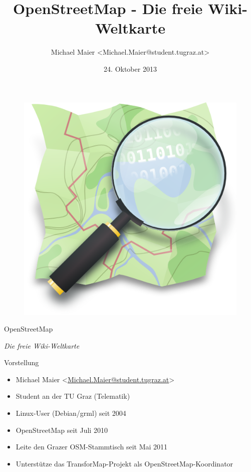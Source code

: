 \documentclass{beamer}
\title{OpenStreetMap - Die freie Wiki-Weltkarte}
\author{Michael Maier \textless Michael.Maier@student.tugraz.at\textgreater}
\date{24. Oktober 2013}
\begin{document}

\begin{frame} 


\begin{figure}
  \centering
  \includegraphics[width=.5\textwidth]{mag_map.png}
\end{figure}

\begin{center}
\Huge{OpenStreetMap\\}
\end{center}

\begin{center}
\Large{\emph{Die freie Wiki-Weltkarte}}
\end{center}

\end{frame}



\begin{frame}{Vorstellung}

  \begin{itemize}
    \item Michael Maier \textless \href{mailto:Michael.Maier@student.tugraz.at}{Michael.Maier@student.tugraz.at}\textgreater
    \item Student an der TU Graz (Telematik)
    \item Linux-User (Debian/grml) seit 2004
    \item OpenStreetMap seit Juli 2010
    \item Leite den Grazer OSM-Stammtisch seit Mai 2011
     \item Unterstütze das TransforMap-Projekt als OpenStreetMap-Koordinator
  \end{itemize}
\end{frame}
\end{document}
